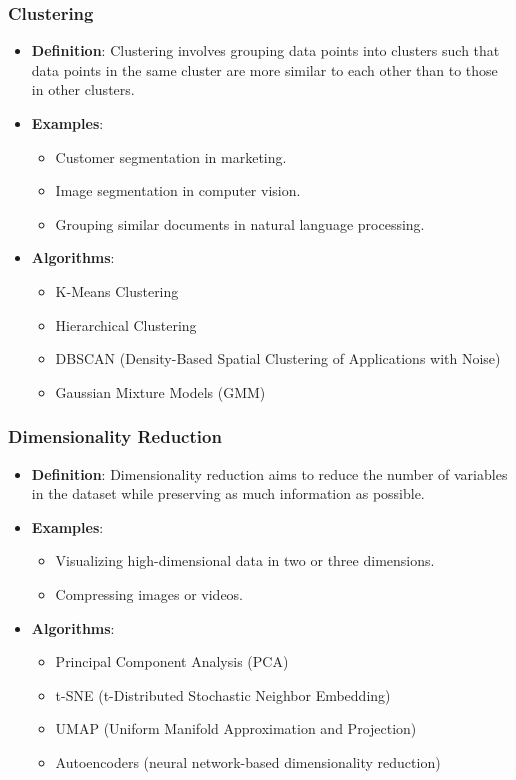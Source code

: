 \subsubsection*{Clustering}
\begin{itemize}
    \item \textbf{Definition}: Clustering involves grouping data points into clusters such that data points in the same cluster are more similar to each other than to those in other clusters.
    \item \textbf{Examples}:
    \begin{itemize}
        \item Customer segmentation in marketing.
        \item Image segmentation in computer vision.
        \item Grouping similar documents in natural language processing.
    \end{itemize}
    \item \textbf{Algorithms}:
    \begin{itemize}
        \item K-Means Clustering
        \item Hierarchical Clustering
        \item DBSCAN (Density-Based Spatial Clustering of Applications with Noise)
        \item Gaussian Mixture Models (GMM)
    \end{itemize}
\end{itemize}

\subsubsection*{Dimensionality Reduction}
\begin{itemize}
    \item \textbf{Definition}: Dimensionality reduction aims to reduce the number of variables in the dataset while preserving as much information as possible.
    \item \textbf{Examples}:
    \begin{itemize}
        \item Visualizing high-dimensional data in two or three dimensions.
        \item Compressing images or videos.
    \end{itemize}
    \item \textbf{Algorithms}:
    \begin{itemize}
        \item Principal Component Analysis (PCA)
        \item t-SNE (t-Distributed Stochastic Neighbor Embedding)
        \item UMAP (Uniform Manifold Approximation and Projection)
        \item Autoencoders (neural network-based dimensionality reduction)
    \end{itemize}
\end{itemize}

